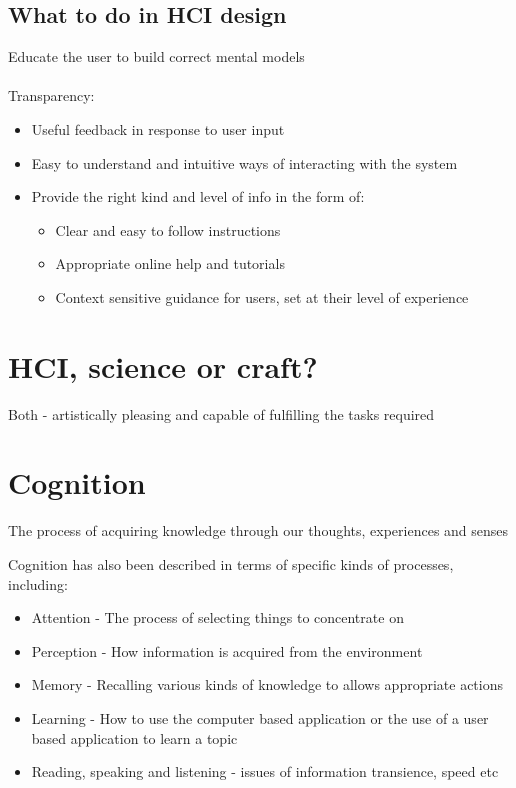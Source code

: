 \documentclass{article}[18pt]
\begin{document}
\subsection{What to do in HCI design}
Educate the user to build correct mental models\\
\\
Transparency:
\begin{itemize}
	\item Useful feedback in response to user input
	\item Easy to understand and intuitive ways of interacting with the system
	\item Provide the right kind and level of info in the form of:
	\begin{itemize}
		\item Clear and easy to follow instructions
		\item Appropriate online help and tutorials
		\item Context sensitive guidance for users, set at their level of experience 
	\end{itemize}
\end{itemize}
\section{HCI, science or craft?}
Both - artistically pleasing and capable of fulfilling the tasks required
\section{Cognition}
\begin{defin}[Cognition]
The process of acquiring knowledge through our thoughts, experiences and senses
\end{defin}
Cognition has also been described in terms of specific kinds of processes, including:
\begin{itemize}
	\item Attention - The process of selecting things to concentrate on
	\item Perception - How information is acquired from the environment
	\item Memory - Recalling various kinds of knowledge to allows appropriate actions
	\item Learning - How to use the computer based application or the use of a user based application to learn a topic
	\item Reading, speaking and listening - issues of information transience, speed etc
\end{itemize}
\end{document}
